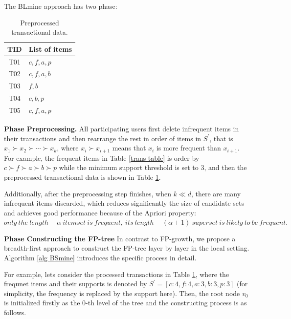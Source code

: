 \documentclass[conference]{IEEEtran}
\begin{document}
The {\color{red} BLmine} approach has two phase:\\

\begin{table}[tb]
\caption{{\color{red}Preprocessed transactional data.}}
\label{preprocessed trans}
\centering
\begin{tabular}{|c|l|}\hline
  TID&List of items \\\hline
  T01&$c,f,a,p$ \\\hline
  T02&$c,f,a,b$ \\\hline
  T03&$f,b$ \\\hline
  T04&$c,b,p$ \\\hline
  T05&$c,f,a,p$ \\\hline
\end{tabular}
\end{table}

\textbf{Phase \uppercase\expandafter{} Preprocessing.} All participating users first delete infrequent items in their transactions and then rearrange the rest in order of items in $S^{\prime}$, that is $x_1 \succ x_2 \succ \cdots  \succ x_k$, where $x_i \succ x_{i+1}$ means that $x_i$ is more frequent than $x_{i+1}$. For example, the frequent items in Table \ref{trans table} is order by $c\succ f\succ a\succ b\succ p$ while the minimum support threshold is set to 3, and then the preprocessed transactional data is shown in Table \ref{preprocessed trans}.

Additionally, after the preprocessing step finishes, when $k \ll d$, there are many infrequent items discarded, which reduces significantly the size of candidate sets and achieves good performance because of the Apriori property\cite{apr}: $only\ the\ length-\alpha\ itemset\ is\ frequent,\ its\ length-(\alpha +1)\ superset\ is\ likely\ to\ be\ frequent.$

\textbf{Phase \uppercase\expandafter{} Constructing the FP-tree} In contrast to FP-growth, we propose a breadth-first approach to construct the FP-tree layer by layer in the local setting. Algorithm \ref{alg BSmine} introduces the specific process in detail. 

For example, lets consider the processed transactions in Table \ref{preprocessed trans}, where the frequnet items and their supports is denoted by $S^{\prime} = \left[c:4 , f:4 , a:3 , b:3, p:3  \right]$ (for simplicity, the frequency is replaced by the support here). Then, the root node $v_0$ is initialized firstly as the 0-th level of the tree and the constructing process is as follows.
\end{document}
